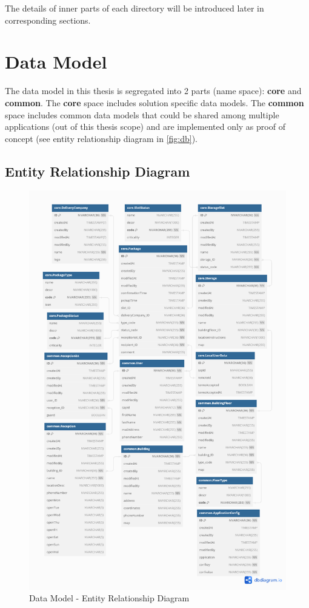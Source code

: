 The details of inner parts of each directory will be introduced later in corresponding sections.

\section{Data Model}
\label{sec:D-db}

The data model in this thesis is segregated into 2 parts (name space): \textbf{core} and \textbf{common}. 
The \textbf{core} space includes solution specific data models. The \textbf{common} space includes common data models that could be shared among multiple applications (out of this thesis scope) and are implemented only as proof of concept (see entity relationship diagram in \autoref{fig:db}). 

\subsection{Entity Relationship Diagram}
\begin{figure}[H]
	\centering
	\includegraphics[width=1\linewidth]{images/DB/DB_Relationship.png}
	\caption{Data Model - Entity Relationship Diagram}
	\label{fig:db}
\end{figure}

